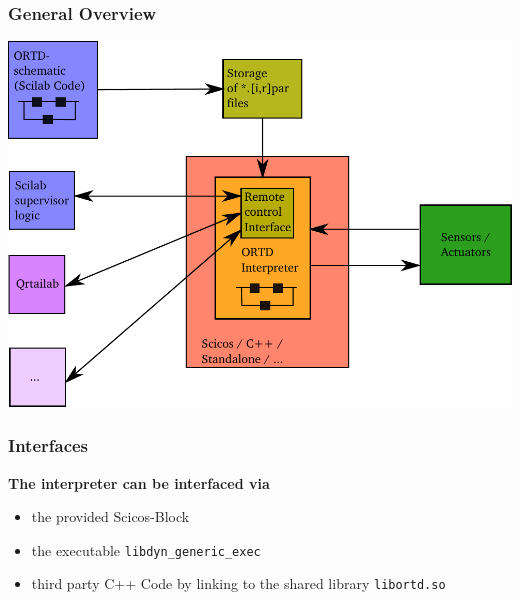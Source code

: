 \documentclass[serif,9pt,xcolor=dvipsnames]{beamer}
\begin{document}
\begin{frame}

 \frametitle{General Overview}



\includegraphics[trim=0mm 0mm 0mm 0mm, clip,width=0.95\linewidth]{../pictures/ortd_principle.pdf}

\end{frame}


\begin{frame}
\frametitle{Interfaces}

\textbf{The interpreter can be interfaced via}
  \begin{itemize}
   \item the provided Scicos-Block
   \item the executable \texttt{libdyn\_generic\_exec}
   \item third party C++ Code by linking to the shared library { \texttt{libortd.so} }
  \end{itemize}

\end{frame}
\end{document}
